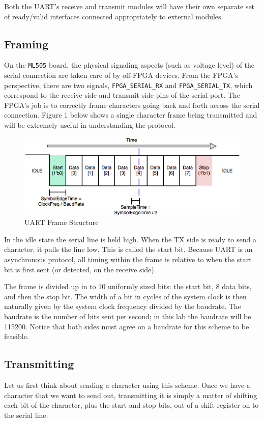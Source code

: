 \documentclass[11pt]{article}
\begin{document}
Both the UART’s receive and transmit modules will have their own separate set of ready/valid interfaces connected appropriately to external modules.

\subsection{Framing}
On the \verb|ML505| board, the physical signaling aspects (such as voltage level) of the serial connection are taken care of by off-FPGA devices. From the FPGA's perspective, there are two signals, \verb|FPGA_SERIAL_RX| and \verb|FPGA_SERIAL_TX|, which correspond to the receive-side and transmit-side pins of the serial port. The FPGA's job is to correctly frame characters going back and forth across the serial connection. Figure 1 below shows a single character frame being transmitted and will be extremely useful in understanding the protocol.

\begin{figure}[H]
	\centerline{\includegraphics[width=6in]{images/uart_frame.png}}
	\caption{UART Frame Structure}
\end{figure}

In the idle state the serial line is held high. When the TX side is ready to send a character, it pulls the line low. This is called the start bit. Because UART is an asynchronous protocol, all timing within the frame is relative to when the start bit is first sent (or detected, on the receive side). 

The frame is divided up in to 10 uniformly sized bits: the start bit, 8 data bits, and then the stop bit. The width of a bit in cycles of the system clock is then naturally given by the system clock frequency divided by the baudrate. The baudrate is the number of bits sent per second; in this lab the baudrate will be 115200. Notice that both sides must agree on a baudrate for this scheme to be feasible.

\subsection{Transmitting}
Let us first think about sending a character using this scheme. Once we have a character that we want to send out, transmitting it is simply a matter of shifting each bit of the character, plus the start and stop bits, out of a shift register on to the serial line. 
\end{document}
